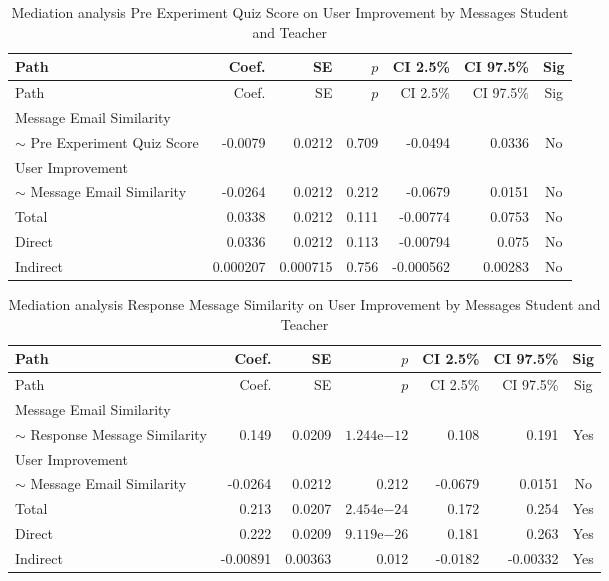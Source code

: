 \begin{longtable}{lrrrrrc}
            \caption{Mediation analysis Pre Experiment Quiz Score on User Improvement by  Messages Student and Teacher}\label{tab:mediation Pre Experiment Quiz Score on User Improvement by  Messages Student and Teacher}\\
            \toprule
            Path & Coef. & SE & $p$ & CI 2.5\% & CI 97.5\% & Sig \\
            \midrule
            \endfirsthead
            \toprule
            Path & Coef. & SE & $p$ & CI 2.5\% & CI 97.5\% & Sig \\
            \midrule
            \endhead
            \bottomrule
            \endfoot
            Message Email Similarity\\ $\sim$ Pre Experiment Quiz Score & -0.0079 & 0.0212 & 0.709 & -0.0494 & 0.0336 & No \\
User Improvement\\ $\sim$ Message Email Similarity & -0.0264 & 0.0212 & 0.212 & -0.0679 & 0.0151 & No \\
Total & 0.0338 & 0.0212 & 0.111 & -0.00774 & 0.0753 & No \\
Direct & 0.0336 & 0.0212 & 0.113 & -0.00794 & 0.075 & No \\
Indirect & 0.000207 & 0.000715 & 0.756 & -0.000562 & 0.00283 & No \\
\end{longtable}

\begin{longtable}{lrrrrrc}
            \caption{Mediation analysis Response Message Similarity on User Improvement by  Messages Student and Teacher}\label{tab:mediation Response Message Similarity on User Improvement by  Messages Student and Teacher}\\
            \toprule
            Path & Coef. & SE & $p$ & CI 2.5\% & CI 97.5\% & Sig \\
            \midrule
            \endfirsthead
            \toprule
            Path & Coef. & SE & $p$ & CI 2.5\% & CI 97.5\% & Sig \\
            \midrule
            \endhead
            \bottomrule
            \endfoot
            Message Email Similarity\\ $\sim$ Response Message Similarity & 0.149 & 0.0209 & $1.244\mathrm{e}{-12}$ & 0.108 & 0.191 & Yes \\
User Improvement\\ $\sim$ Message Email Similarity & -0.0264 & 0.0212 & 0.212 & -0.0679 & 0.0151 & No \\
Total & 0.213 & 0.0207 & $2.454\mathrm{e}{-24}$ & 0.172 & 0.254 & Yes \\
Direct & 0.222 & 0.0209 & $9.119\mathrm{e}{-26}$ & 0.181 & 0.263 & Yes \\
Indirect & -0.00891 & 0.00363 & 0.012 & -0.0182 & -0.00332 & Yes \\
\end{longtable}

